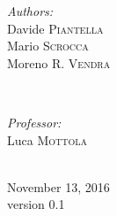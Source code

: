 \documentclass[a4paper,10pt]{article}
\begin{document}
\begin{titlepage}
\begin{minipage}{0.4\textwidth}
\begin{flushleft} \large
\emph{Authors:}\\
Davide \textsc{Piantella}\\
Mario \textsc{Scrocca}\\
Moreno R. \textsc{Vendra} %
\end{flushleft}
\end{minipage}
~
\begin{minipage}{0.4\textwidth}
\begin{flushright} \large
\emph{Professor:} \\
Luca \textsc{Mottola} %
\end{flushright}
\end{minipage}\\[2cm]



{\large November 13, 2016}\\[0.5cm] %
{\large version 0.1}\\[2cm]
 

\vfill %

\end{titlepage}
\clearpage
\tableofcontents
\clearpage
{}
\end{document}

